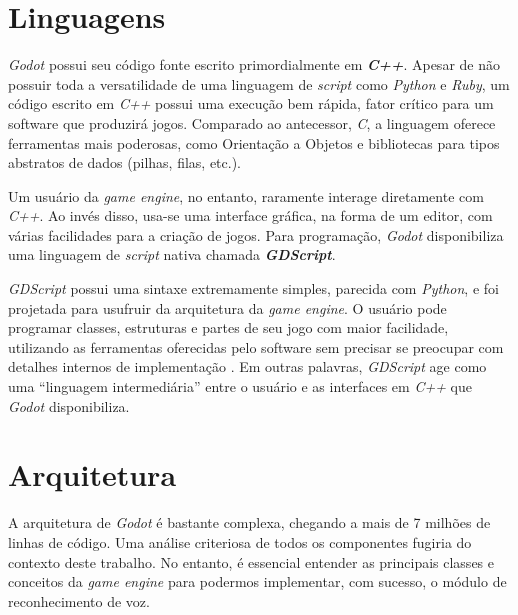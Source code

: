 
\section{Linguagens}
\label{godotLanguages}

\textit{Godot} possui seu código fonte escrito primordialmente em \textbf{\textit{C++}}. Apesar de não possuir toda a versatilidade de uma linguagem de \textit{script} como \textit{Python} e \textit{Ruby}, um código escrito em \textit{C++} possui uma execução bem rápida, fator crítico para um software que produzirá jogos. Comparado ao antecessor, \textit{C}, a linguagem oferece ferramentas mais poderosas, como Orientação a Objetos e bibliotecas para tipos abstratos de dados (pilhas, filas, etc.).

Um usuário da \textit{game engine}, no entanto, raramente interage diretamente com \textit{C++}. Ao invés disso, usa-se uma interface gráfica, na forma de um editor, com várias facilidades para a criação de jogos. Para programação, \textit{Godot} disponibiliza uma linguagem de \textit{script} nativa chamada \mbox{\textbf{\textit{GDScript}}}.

\mbox{\textit{GDScript}} possui uma sintaxe extremamente simples, parecida com \textit{Python}, e foi projetada para usufruir da arquitetura da \textit{game engine}. O usuário pode programar classes, estruturas e partes de seu jogo com maior facilidade, utilizando as ferramentas oferecidas pelo software sem precisar se preocupar com detalhes internos de implementação \citep{godotGDScript}. Em outras palavras, \mbox{\textit{GDScript}} age como uma ``linguagem intermediária'' entre o usuário e as interfaces em \textit{C++} que \textit{Godot} disponibiliza.


\section{Arquitetura}

A arquitetura de \textit{Godot} é bastante complexa, chegando a mais de 7 milhões de linhas de código. Uma análise criteriosa de todos os componentes fugiria do contexto deste trabalho. No entanto, é essencial entender as principais classes e conceitos da \textit{game engine} para podermos implementar, com sucesso, o módulo de reconhecimento de voz.

